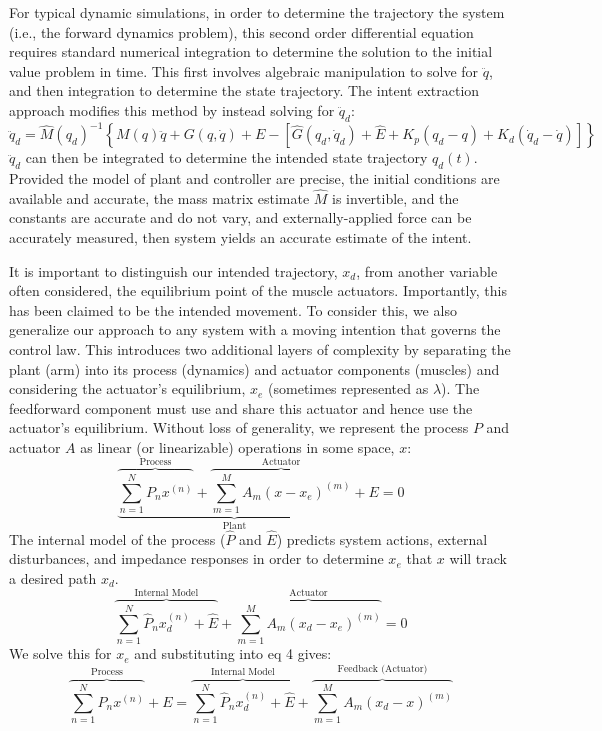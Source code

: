 \documentclass[10pt]{article}
\begin{document}
For typical dynamic simulations, in order to determine the trajectory the system (i.e., the forward dynamics problem), this second order differential equation requires standard numerical integration to determine the solution to the initial value problem in time. This first involves algebraic manipulation to solve for $\ddot{q}$, and then integration to determine the state trajectory. The intent extraction approach modifies this method by instead solving for $\ddot{q}_d$:
\begin{equation}
\ddot{q}_d=\hat{M}(q_d)^{-1}\left\{M(q)\ddot{q}+G(q,\dot{q})+E-[\hat{G}(q_d,\dot{q}_d)+\hat{E}+K_p(q_d-q)+K_d(\dot{q}_d-\dot{q})]\right\}
\end{equation}  
$\ddot{q}_d$ can then be integrated to determine the intended state trajectory $q_d(t)$. Provided the model of plant and controller are precise, the initial conditions are available and accurate, the mass matrix estimate $\hat{M}$ is invertible, and the constants are accurate and do not vary, and externally-applied force can be accurately measured, then system yields an accurate estimate of the intent.

It is important to distinguish our intended trajectory, $x_d$, from another variable often considered, the equilibrium point of the muscle actuators. Importantly, this has been claimed to be the intended movement. To consider this, we also generalize our approach to any system with a moving intention that governs the control law. This introduces two additional layers of complexity by separating the plant (arm) into its process (dynamics) and actuator components (muscles) and considering the actuator's equilibrium, $x_e$ (sometimes represented as $\lambda$). The feedforward component must use and share this actuator and hence use the actuator's equilibrium. Without loss of generality, we represent the process $P$ and actuator $A$ as linear (or linearizable) operations in some space, $x$:
\begin{equation}
\underbrace{\overbrace{\sum_{n=1}^N P_nx^{(n)}}^\text{Process}+\overbrace{\sum_{m=1}^M A_m(x-x_e)^{(m)}}^\text{Actuator}}_\text{Plant}+E=0
\end{equation}
The internal model of the process ($\hat{P}$ and $\hat{E}$) predicts system actions, external disturbances, and impedance responses in order to determine $x_e$ that $x$ will track a desired path $x_d$.    
\begin{equation}
\overbrace{\sum_{n=1}^N \hat{P}_n x^{(n)}_d+\hat{E}}^\text{Internal Model}+\overbrace{\sum_{m=1}^M A_m(x_d-x_e)^{(m)}}^\text{Actuator}=0
\end{equation}
We solve this for $x_e$ and substituting into eq 4 gives:
\begin{equation}
\overbrace{\sum_{n=1}^N P_nx^{(n)}}^\text{Process}+E=\overbrace{\sum_{n=1}^N \hat{P}_n x^{(n)}_d+\hat{E}}^\text{Internal Model}+\overbrace{\sum_{m=1}^M A_m (x_d-x)^{(m)}}^\text{Feedback (Actuator)}
\end{equation}
\end{document}
